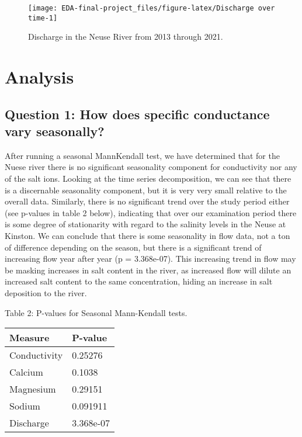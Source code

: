 \documentclass[
  12pt,
]{article}
\begin{document}
\begin{figure}

\texttt{[image: EDA-final-project\_files/figure-latex/Discharge over time-1]} \hfill{}

\caption{Discharge in the Neuse River from 2013 through 2021.}\label{fig:Discharge over time}
\end{figure}

\newpage

\hypertarget{analysis}{%
\section{Analysis}\label{analysis}}

\hypertarget{question-1-how-does-specific-conductance-vary-seasonally}{%
\subsection{Question 1: How does specific conductance vary
seasonally?}\label{question-1-how-does-specific-conductance-vary-seasonally}}

After running a seasonal MannKendall test, we have determined that for
the Nuese river there is no significant seasonality component for
conductivity nor any of the salt ions. Looking at the time series
decomposition, we can see that there is a discernable seasonality
component, but it is very very small relative to the overall data.
Similarly, there is no significant trend over the study period either
(see p-values in table 2 below), indicating that over our examination
period there is some degree of stationarity with regard to the salinity
levels in the Neuse at Kinston. We can conclude that there is some
seasonality in flow data, not a ton of difference depending on the
season, but there is a significant trend of increasing flow year after
year (p = 3.368e-07). This increasing trend in flow may be masking
increases in salt content in the river, as increased flow will dilute an
increased salt content to the same concentration, hiding an increase in
salt deposition to the river.

Table 2: P-values for Seasonal Mann-Kendall tests.

\begin{longtable}[]{@{}ll@{}}
\toprule
Measure & P-value \\
\midrule
\endhead
Conductivity & 0.25276 \\
Calcium & 0.1038 \\
Magnesium & 0.29151 \\
Sodium & 0.091911 \\
Discharge & 3.368e-07 \\
\bottomrule
\end{longtable}
\end{document}
